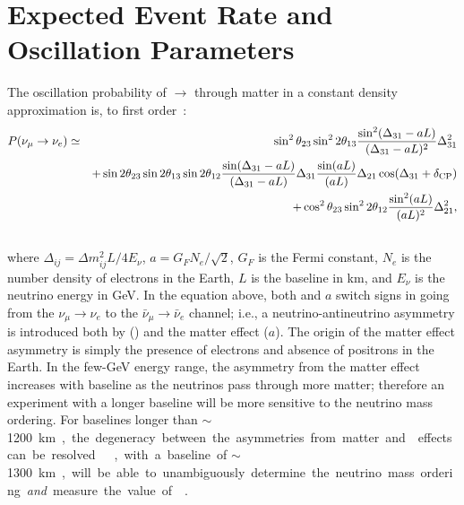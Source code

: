 \section{Expected Event Rate and Oscillation Parameters}
\label{sec:physics-lbnosc-osc}


The oscillation probability of \numu $\rightarrow$ \nue through matter in a constant density
approximation is,  %
to first order~\cite{Nunokawa:2007qh}:
%
\begin{eqnarray}
P(\nu_\mu \rightarrow \nu_e) & \simeq & \sin^2 \theta_{23} \sin^2 2 \theta_{13} 
\frac{ \sin^2(\Delta_{31} - aL)}{(\Delta_{31}-aL)^2} \Delta_{31}^2\\ \nonumber
& & + \sin 2 \theta_{23} \sin 2 \theta_{13} \sin 2 \theta_{12} \frac{ \sin(\Delta_{31} - aL)}{(\Delta_{31}-aL)} \Delta_{31} \frac{\sin(aL)}{(aL)} \Delta_{21} \cos (\Delta_{31} + \delta_{\rm CP})\\ \nonumber
& & + \cos^2 \theta_{23} \sin^2 2 \theta_{12} \frac {\sin^2(aL)}{(aL)^2} \Delta_{21}^2, \\ \nonumber
\label{eqn:appprob}
\end{eqnarray}
where $\Delta_{ij} = \Delta m^2_{ij} L/4E_\nu$, $a = G_FN_e/\sqrt{2}$, $G_F$ is the Fermi constant, $N_e$ is the number density of electrons in the Earth, $L$ is the baseline in km, and $E_\nu$ is the neutrino energy in GeV. 
In the equation above, both \deltacp and $a$ 
switch signs in going from the
$\nu_\mu \to \nu_e$ to the $\bar{\nu}_\mu \to \bar{\nu}_e$ channel; i.e.,
a neutrino-antineutrino asymmetry is introduced both by  (\deltacp)
and the matter effect ($a$). The origin of the matter effect asymmetry 
is simply the presence of electrons and absence of positrons in the Earth.  
In the few-GeV energy range, the asymmetry from the matter effect increases with baseline as the neutrinos
pass through more matter; therefore an experiment with a longer baseline will be
more sensitive to the neutrino mass ordering. For baselines longer than 
$\sim$\SI{1200}\km, the degeneracy between the asymmetries from matter
and  effects can be resolved~\cite{Bass:2013vcg}. , with a baseline of $\sim$\SI{1300}\km, 
will be able to unambiguously
determine the neutrino mass ordering \textit{and} measure the value of \deltacp~\cite{Diwan:2004bt}. 

